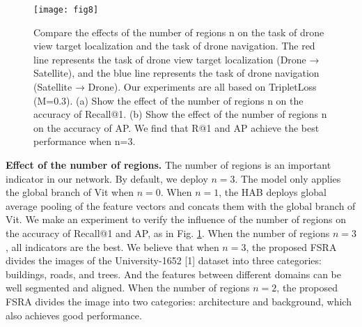\documentclass[lettersize,journal]{IEEEtran}
\begin{document}
\begin{figure}[!t]
\centering
\texttt{[image: fig8]}
\caption{Compare the effects of the number of regions n on the task of drone view target localization and the task of drone navigation. The red line represents the task of drone view target localization (Drone → Satellite), and the blue line represents the task of drone navigation (Satellite → Drone). Our experiments are all based on TripletLoss (M=0.3). (a) Show the effect of the number of regions n on the accuracy of Recall@1. (b) Show the effect of the number of regions n on the accuracy of AP. We find that R@1 and AP achieve the best performance when n=3.}
\label{fig_8}
\end{figure}
\textbf{Effect of the number of regions.} The number of regions is an important indicator in our network. By default, we deploy $n=3$. The model only applies the global branch of Vit when $n=0$.  When $n=1$, the HAB deploys global average pooling of the feature vectors and concats them with the global branch of Vit. We make an experiment to verify the influence of the number of regions on the accuracy of Recall@1 and AP, as in Fig. \ref{fig_8}. When the number of regions $n=3$, all indicators are the best. We believe that when $n=3$, the proposed FSRA divides the images of the University-1652 [1] dataset into three categories: buildings, roads, and trees. And the features between different domains can be well segmented and aligned. When the number of regions $n=2$, the proposed FSRA divides the image into two categories: architecture and background, which also achieves good performance. 
\end{document}
